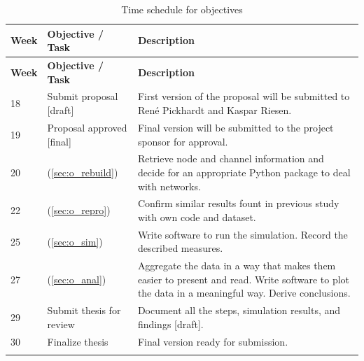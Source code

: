 \documentclass[final]{fhnwreport}       %
\begin{document}
\renewcommand{\arraystretch}{1.5} %
\begin{longtable}[l]{l|p{4cm}|p{9cm}} %
\normalfont\textbf{Week} & \normalfont\textbf{Objective / Task} & \normalfont\textbf{Description} \\
\hline

\endfirsthead %
\normalfont\textbf{Week} & \normalfont\textbf{Objective / Task} & \normalfont\textbf{Description} \\
\hline
\endhead %

18 & Submit proposal [draft] & First version of the proposal will be submitted to René Pickhardt and Kaspar Riesen. \\
19 & Proposal approved [final] & Final version will be submitted to the project sponsor for approval. \\
20 & \nameref{sec:o_rebuild} (\ref{sec:o_rebuild}) & Retrieve node and channel information and decide for an appropriate Python package to deal with networks.  \\
22 & \nameref{sec:o_repro} (\ref{sec:o_repro}) & Confirm similar results fount in previous study \cite{pickhardt_imbalance_2019} with own code and dataset. \\

25 & \nameref{sec:o_sim} (\ref{sec:o_sim}) & Write software to run the simulation. Record the described measures.  \\

27 & \nameref{sec:o_anal} (\ref{sec:o_anal}) & Aggregate the data in a way that makes them easier to present and read. Write software to plot the data in a meaningful way. Derive conclusions.  \\
29 & Submit thesis for review & Document all the steps, simulation results, and findings [draft].  \\
30 & Finalize thesis & Final version ready for submission. \\

\caption{Time schedule for objectives}
\label{tab:Table1}

\end{longtable}
\end{document}
